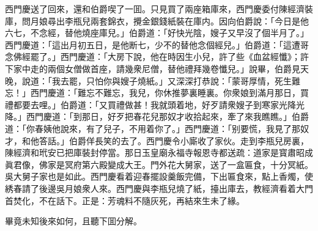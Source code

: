 西門慶送了回來，還和伯爵喫了一囬。只見買了兩座箱庫來，西門慶委付陳經濟裝庫，問月娘尋出李瓶兒兩套錦衣，攪金銀錢紙裝在庫内。因向伯爵說：「今日是他六七，不念經，替他燒座庫兒。」伯爵道：「好快光陰，嫂子又早沒了個半月了。」西門慶道：「這出月初五日，是他断七，少不的替他念個經兒。」伯爵道：「這遭哥念佛經罷了。」西門慶道：「大房下說，他在時因生小兒，許了些《血盆經懺》；許下家中走的兩個女僧做首座，請幾衆尼僧，替他禮拜幾卷懺兒。」說畢，伯爵見天晚，說道：「我去罷，只怕你與嫂子燒紙。」又深深打恭說：「蒙哥厚情，死生難忘！」西門慶道：「難忘不難忘，我兒，你休推夢裏睡裏。你衆娘到滿月那日，買禮都要去哩。」伯爵道：「又買禮做甚！我就頭着地，好歹請衆嫂子到寒家光降光降。」西門慶道：「到那日，好歹把春花兒那奴才收拾起來，牽了來我瞧瞧。」伯爵道：「你春姨他說來，有了兒子，不用着你了。」西門慶道：「别要慌，我見了那奴才，和他答話。」伯爵佯長笑的去了。西門慶令小廝收了家伙。走到李瓶兒房裏，陳經濟和玳安已把庫裝封停當。那日玉皇廟永福寺報恩寺都送疏：道家是寳肅昭成眞君像，佛家是冥府第六殿變成大王。門外花大舅家，送了一盒匾食，十分冥紙。吳大舅子家也是如此。西門慶看着迎春擺設羹飯完備，下出匾食來，點上香燭，使綉春請了後邊吳月娘衆人來。西門慶與李瓶兒燒了紙，擡出庫去，教經濟看着大門首焚化，不在話下。正是：芳魂料不隨灰死，再結來生未了緣。

畢竟未知後來如何，且聽下囬分解。

